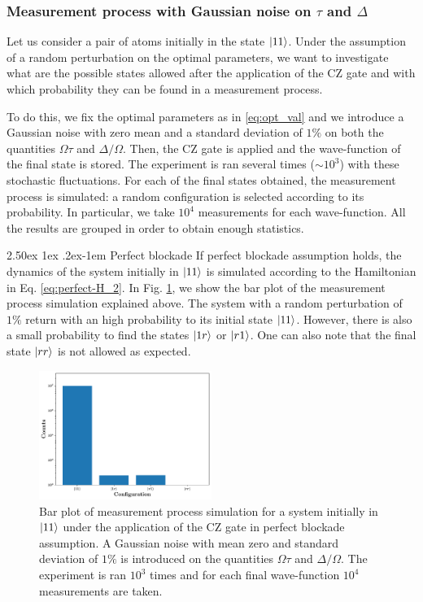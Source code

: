 \documentclass[rmp,10pt,onecolumn,fleqn,notitlepage]{revtex4-1}
\makeatletter
\renewcommand{\paragraph}{%
    \@startsection{paragraph}{4}%
    {\z@}{2.50ex \@plus 1ex \@minus .2ex}{-1em}%
    {\bf\sffamily}%
}
\makeatother
\begin{document}
\subsubsection{Measurement process with Gaussian noise on $\tau$ and $\Delta$}

Let us consider a pair of atoms initially in the state $\left\vert{11}\right\rangle$. Under the assumption of a random perturbation on the optimal parameters, we want to investigate what are the possible states allowed after the application of the CZ gate and with which probability they can be found in a measurement process.

To do this, we fix the optimal parameters as in \eqref{eq:opt_val} and we introduce a Gaussian noise with zero mean and a standard deviation of $1\%$ on both the quantities $\Omega \tau$ and $\Delta/\Omega$. Then, the CZ gate is applied and the wave-function of the final state is stored.
The experiment is ran several times ($\sim 10^3$) with these stochastic fluctuations. 
For each of the final states obtained, the measurement process is simulated: a random configuration is selected according to its probability. In particular, we take $10^4$ measurements for each wave-function. All the results are grouped in order to obtain enough statistics.

\paragraph{Perfect blockade} If perfect blockade assumption holds, the dynamics of the system initially in $\left\vert{11}\right\rangle$ is simulated according to the Hamiltonian in Eq. \eqref{eq:perfect-H_2}. In Fig. \ref{fig:measurement_perfect-blockade}, we show the bar plot of the measurement process simulation explained above. The system with a random perturbation of $1\%$ return with an high probability to its initial state $\left\vert{11}\right\rangle$. However, there is also a small probability to find the states $\left\vert{1r}\right\rangle$ or $\left\vert{r1}\right\rangle$.
One can also note that the final state $\left\vert{rr}\right\rangle$ is not allowed as expected. 

\begin{figure}[H]
    \centering
    \includegraphics[width=0.5\textwidth]{image/two-qubit-system/measurement/noise_measurement_two-qubit.pdf}
    \caption{Bar plot of measurement process simulation for a system initially in $\left\vert{11}\right\rangle$ under the application of the CZ gate in perfect blockade assumption. A Gaussian noise with mean zero and standard deviation of $1\%$ is introduced on the quantities $\Omega\tau$ and $\Delta/\Omega$. The experiment is ran $10^3$ times and for each final wave-function $10^4$ measurements are taken.}
    \label{fig:measurement_perfect-blockade}
\end{figure}
\end{document}
